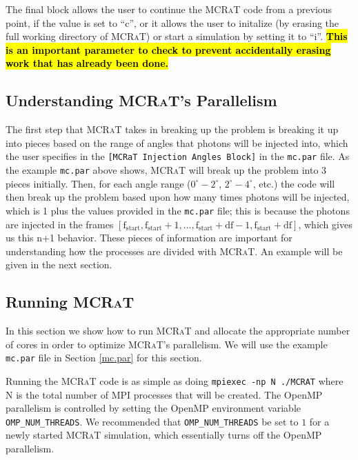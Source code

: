 \documentclass[12pt,a4paper]{article}
\newcommand{\mcrat}{\textsc{MCRaT}}
\begin{document}
The final block allows the user to continue the \mcrat{} code from a previous point, if the value is set to ``c'', or it allows the user to initalize (by erasing the full working directory of \mcrat{}) or start a simulation by setting it to ``i''. \hl{\bf This is an important parameter to check to prevent accidentally erasing work that has already been done.}


\subsection{Understanding \mcrat{}'s Parallelism}
The first step that \mcrat{} takes in breaking up the problem is breaking it up into pieces based on the range of angles that photons will be injected into, which the user specifies in the \texttt{[MCRaT Injection Angles Block]} in the \texttt{mc.par} file. As the example \texttt{mc.par} above shows, \mcrat{} will break up the problem into 3 pieces initially. Then, for each angle range ($0^\circ-2^\circ$, $2^\circ-4^\circ$, etc.) the code will then break up the problem based upon how many times photons will be injected, which is 1 plus the values provided in the \texttt{mc.par} file; this is because the photons are injected in the frames $[\mathrm{f_{start}}, \mathrm{f_{start}}+1, ..., \mathrm{f_{start}}+\mathrm{df}-1, \mathrm{f_{start}}+\mathrm{df}]$, which gives us this n+1 behavior. These pieces of information are important for understanding how the processes are divided with \mcrat{}. An example will be given in the next section.

\subsection{Running \mcrat{}}
In this section we show how to run \mcrat{} and allocate the appropriate number of cores in order to optimize \mcrat{}'s parallelism. We will use the example \texttt{mc.par} file in Section \ref{mc.par} for this section. 

Running the \mcrat{} code is as simple as doing \texttt{mpiexec -np N ./MCRAT} where N is the total number of MPI processes that will be created. The OpenMP parallelism is controlled by setting the OpenMP environment variable \texttt{OMP\_NUM\_THREADS}. We recommended that \texttt{OMP\_NUM\_THREADS} be set to $1$ for a newly started \mcrat{} simulation, which essentially turns off the OpenMP parallelism. 
\end{document}
